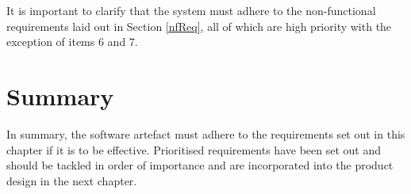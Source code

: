 It is important to clarify that the system must adhere to the non-functional requirements laid out in Section \ref{nfReq}, all of which are high priority with the exception of items 6 and 7.

\section{Summary}
In summary, the software artefact must adhere to the requirements set out in this chapter if it is to be effective.  Prioritised requirements have been set out and should be tackled in order of importance and are incorporated into the product design in the next chapter. 
